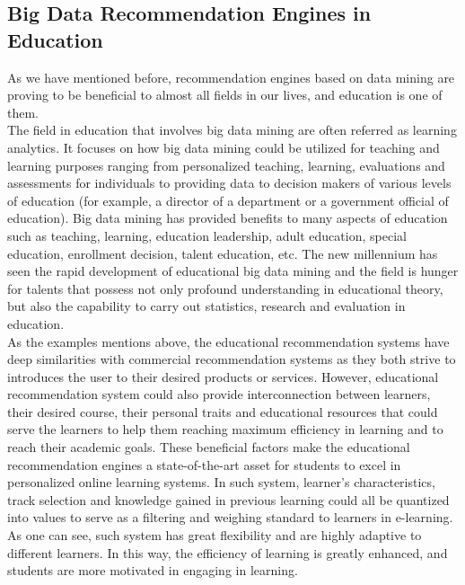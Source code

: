 \documentclass[sigconf]{acmart}
\begin{document}
\subsection{Big Data Recommendation Engines in Education}
As we have mentioned before, recommendation engines based on data mining are proving to be beneficial to almost all fields in our lives, and education is one of them.\\
The field in education that involves big data mining are often referred as learning analytics. It focuses on how big data mining could be utilized for teaching and learning purposes ranging from personalized teaching, learning, evaluations and assessments for individuals to providing data to decision makers of various levels of education (for example, a director of a department or a government official of education).  Big data mining has provided benefits to many aspects of education such as teaching, learning, education leadership, adult education, special education, enrollment decision, talent education, etc. The new millennium has seen the rapid development of educational big data mining and the field is hunger for talents that possess not only profound understanding in educational theory, but also the capability to carry out statistics, research and evaluation in education\cite{Romero2009}.\\
As the examples mentions above, the educational recommendation systems have deep similarities with commercial recommendation systems as they both strive to introduces the user to their desired products or services. However, educational recommendation system could also provide interconnection between learners, their desired course, their personal traits and educational resources that could serve the learners to help them reaching maximum efficiency in learning and to reach their academic goals. These beneficial factors make the educational recommendation engines a state-of-the-art asset for students to excel in personalized online learning systems. In such system, learner's characteristics, track selection and knowledge gained in previous learning could all be quantized into values to serve as a filtering and weighing standard to learners in e-learning. As one can see, such system has great flexibility and are highly adaptive to different learners. In this way, the efficiency of learning is greatly enhanced, and students are more motivated in engaging in learning\cite{Romero2008}.\\
\end{document}
